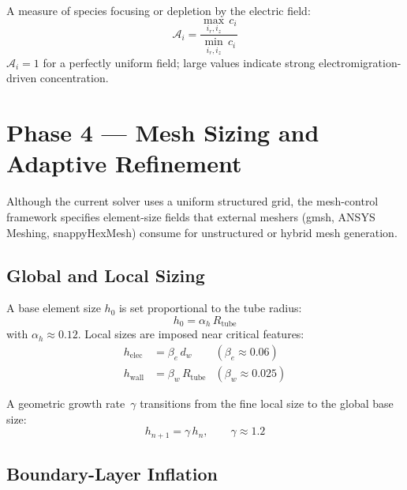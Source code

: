 \documentclass[11pt,a4paper]{article}
\begin{document}
A measure of species focusing or depletion by the electric field:
\begin{equation}\label{eq:accumulation}
  \mathcal{A}_i = \frac{\max_{i_r,i_z}\,c_{i}}
                       {\min_{i_r,i_z}\,c_{i}}
\end{equation}
$\mathcal{A}_i = 1$ for a perfectly uniform field; large values indicate
strong electromigration-driven concentration.

\section{Phase 4 — Mesh Sizing and Adaptive Refinement}
\label{sec:phase4}

Although the current solver uses a uniform structured grid, the mesh-control
framework specifies element-size fields that external meshers (gmsh, ANSYS
Meshing, snappyHexMesh) consume for unstructured or hybrid mesh generation.

\subsection{Global and Local Sizing}

A base element size $h_0$ is set proportional to the tube radius:
\begin{equation}\label{eq:h0}
  h_0 = \alpha_h\,R_{\mathrm{tube}}
\end{equation}
with $\alpha_h \approx 0.12$.  Local sizes are imposed near critical features:
\begin{align}
  h_{\mathrm{elec}} &= \beta_e\,d_w  & (\beta_e \approx 0.06) \label{eq:h_elec} \\
  h_{\mathrm{wall}} &= \beta_w\,R_{\mathrm{tube}} & (\beta_w \approx 0.025) \label{eq:h_wall}
\end{align}

A geometric growth rate~$\gamma$ transitions from the fine local size to the
global base size:
\begin{equation}\label{eq:growth}
  h_{n+1} = \gamma\,h_n, \qquad \gamma \approx 1.2
\end{equation}

\subsection{Boundary-Layer Inflation}
\end{document}
